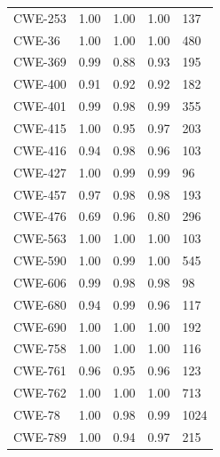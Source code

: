 \documentclass[conference]{IEEEtran}
\begin{document}
\begin{table}[h]
\begin{tabular}{lllll}
CWE-253      & 1.00               & 1.00            & 1.00              & 137             \\
CWE-36       & 1.00               & 1.00            & 1.00              & 480             \\
CWE-369      & 0.99               & 0.88            & 0.93              & 195             \\
CWE-400      & 0.91               & 0.92            & 0.92              & 182             \\
CWE-401      & 0.99               & 0.98            & 0.99              & 355             \\
CWE-415      & 1.00               & 0.95            & 0.97              & 203             \\
CWE-416      & 0.94               & 0.98            & 0.96              & 103             \\
CWE-427      & 1.00               & 0.99            & 0.99              & 96              \\
CWE-457      & 0.97               & 0.98            & 0.98              & 193             \\
CWE-476      & 0.69               & 0.96            & 0.80              & 296             \\
CWE-563      & 1.00               & 1.00            & 1.00              & 103             \\
CWE-590      & 1.00               & 0.99            & 1.00              & 545             \\
CWE-606      & 0.99               & 0.98            & 0.98              & 98              \\
CWE-680      & 0.94               & 0.99            & 0.96              & 117             \\
CWE-690      & 1.00               & 1.00            & 1.00              & 192             \\
CWE-758      & 1.00               & 1.00            & 1.00              & 116             \\
CWE-761      & 0.96               & 0.95            & 0.96              & 123             \\
CWE-762      & 1.00               & 1.00            & 1.00              & 713             \\
CWE-78       & 1.00               & 0.98            & 0.99              & 1024            \\
CWE-789      & 1.00               & 0.94            & 0.97              & 215             \\

\end{tabular}
\end{table}
\end{document}
